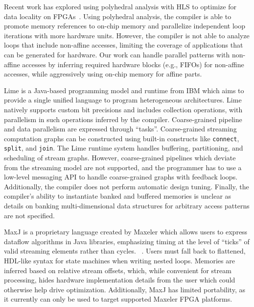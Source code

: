 Recent work has explored using polyhedral analysis with HLS to optimize for data
locality on FPGAs~\cite{pouchet13fpga}.  Using polyhedral analysis, the compiler
is able to promote memory references to on-chip memory and parallelize
independent loop iterations with more hardware units.  However, the compiler is
not able to analyze loops that include non-affine accesses, limiting the
coverage of applications that can be generated for hardware. Our work can
handle parallel patterns with non-affine accesses by inferring required
hardware blocks (e.g., FIFOs) for non-affine accesses, while
aggressively using on-chip memory for affine parts.


Lime is a Java-based programming model and runtime from IBM which aims to provide a single unified language to program heterogeneous architectures. Lime natively supports custom bit precisions and includes collection operations, with parallelism in such operations inferred by the compiler. Coarse-grained pipeline and data parallelism are expressed through ``tasks''. Coarse-grained streaming computation graphs can be constructed using built-in constructs like \texttt{\small{connect}}, \texttt{\small{split}}, and \texttt{\small{join}}. The Lime runtime system handles buffering, partitioning, and scheduling of stream graphs. However, coarse-grained pipelines which deviate from the streaming model are not supported, and the programmer has to use a low-level messaging API to handle coarse-grained graphs with feedback loops. Additionally, the compiler does not perform automatic design tuning. Finally, the compiler's ability to instantiate banked and buffered memories is unclear as details on banking multi-dimensional data structures for arbitrary access patterns are not specified.

MaxJ is a proprietary language created by Maxeler which allows users to express dataflow algorithms in Java libraries, emphasizing
timing at the level of ``ticks'' of valid streaming elements rather than cycles. ~\cite{maxeler}.
Users must fall back to flattened, HDL-like syntax for state machines when writing nested loops.
Memories are inferred based on relative stream offsets, which, while convenient for stream processing,
hides hardware implementation details from the user which could otherwise help drive optimization.
Additionally, MaxJ has limited portability, as it currently can only be used to target supported Maxeler FPGA platforms.

